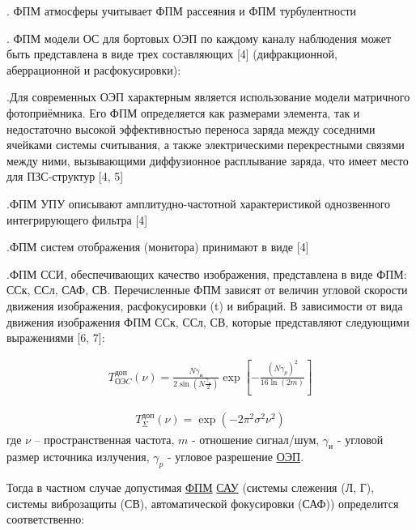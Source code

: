  . ФПМ атмосферы  учитывает ФПМ рассеяния   и ФПМ турбулентности  

 . ФПМ модели ОС для бортовых ОЭП по каждому каналу наблюдения может быть представлена  в виде трех составляющих [4] (дифракционной, аберрационной и расфокусировки):

 .Для современных ОЭП характерным является использование модели матричного фотоприёмника. Его ФПМ определяется как размерами элемента, так и недостаточно высокой эффективностью переноса заряда между соседними ячейками системы считывания, а также электрическими перекрестными связями между ними, вызывающими диффузионное расплывание заряда, что имеет место для ПЗС-структур [4, 5]

 .ФПМ УПУ описывают амплитудно-частотной характеристикой однозвенного интегрирующего фильтра [4]

 .ФПМ  систем отображения (монитора) принимают в виде [4]

 .ФПМ ССИ, обеспечивающих качество изображения, представлена в виде ФПМ: ССк, ССл, САФ, СВ. Перечисленные ФПМ зависят от величин угловой скорости движения изображения, расфокусировки (t) и вибраций. 
В зависимости от вида движения изображения ФПМ ССк, ССл, СВ, которые представляют следующими выражениями [6, 7]: 


\begin{equation}
\label{eq:p2:3}
\begin{alignedat}{2}
T_{\textit{ОЭC}}^{\textit{доп}}\left(\nu{}\right)=
\frac{N{\gamma{}}_\textit{и}}{2\sin{\left(N\frac{{\gamma{}}_\textit{и}}{2}\right)}}
\exp{\left[-\frac{{\left(N{\gamma{}}_p\right)}^2}{16\ln{\left(2m\right)}}\right]}
\end{alignedat}
\end{equation}

\begin{equation}
\label{eq:p2:4}
\begin{alignedat}{2}
T_{\Sigma{}}^{\textit{доп}}\left(\nu\right)=\exp{\left(-2{\pi{}}^2{\sigma{}}^2\nu^2\right)}
\end{alignedat}
\end{equation}
где 
$\nu$ – пространственная частота, 
$m$ - отношение сигнал/шум, 
$\gamma_\textit{и}$ - угловой размер источника излучения, 
$\gamma_\textit{p}$ - угловое разрешение \hyperref[acroEOS]{ОЭП}. 

Тогда в частном случае допустимая \hyperref[acroFPM]{ФПМ} \hyperref[acroSAU]{САУ} (системы слежения (Л, Г), системы виброзащиты (СВ), автоматической фокусировки (САФ)) определится соответственно: 

